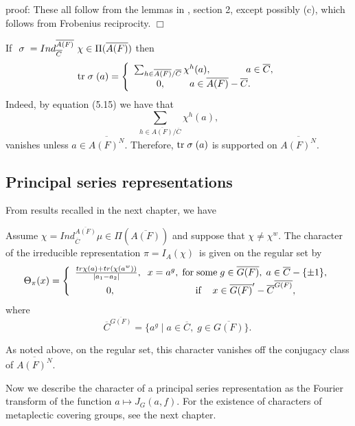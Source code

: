 proof: These all follow from the lemmas in \cite{GeKn}, section 2, except
possibly (c), which follows from Frobenius reciprocity. $\Box $

\begin{corollary}
If $\ \sigma {\rm \;}=Ind_{\overline{C}}^{\overline{A(F)}}\ \chi
\in \Pi (\overline{A(F)})$ then 
\[
{\rm tr}\;\sigma {\rm \;}(a)=\left\{ 
\begin{array}{c}
\sum_{h\in \overline{A(F)}/\overline{C}}\chi
^h(a),\;\;\;\;\;\;\;\;\;\;\;\;\;a\in \overline{C}, \\ 
0,\;\;\;\;\;\;\;\;\;a\in \overline{A(F)}-\overline{C}.
\end{array}
\right. 
\]
Indeed, by equation (5.15) we have that
\[
\sum_{h\in \overline{A(F)}/\overline{C}}\chi^h(a),
\]
vanishes unless $a\in \overline{A(F)^N}$. Therefore,
${\rm tr}\;\sigma {\rm \;}(a)$ is supported on
$\overline{A(F)^N}$.
\end{corollary}

\subsection{Principal series representations}
From results recalled in the next chapter, we have

\begin{lemma}
Assume $\chi =Ind_{\overline{C}}^{\overline{A(F)}}\mu
\in \Pi (\overline{A(F)})$ and suppose that $\chi \neq \chi ^w$.
The character of the
irreducible representation $\pi =I_{A}(\chi )$\ is given on the regular
set by
\[
\Theta _\pi (x)=\left\{
\begin{array}{c}
\frac{tr\chi (a)+tr(\chi (a^w))}{|a_1-a_2|},
\;\;x=a^g,\;{\rm for\;some}\;g\in \overline{G(F)},
\;a\in \overline{C}-\{\pm 1\}, \\
0,\;\;\;\;\;\;\;\;\;\;\;\;\;\;\;\;\;\;\;\;\;\;\;\;\;\;\;\;\;
{\rm \;if\;}\;\;\;
x\in \overline{G(F)}^{\prime }-\overline{C}^{\overline{G(F)}},
\end{array}
\right.
\]
where
\[
\overline{C}^{\overline{G(F)}}=\{a^g\;|\;a\in \overline{C},\;g\in
\overline{G(F)}\}.\
\]
\end{lemma}

\begin{remark} As noted above, on the regular set,
this character vanishes off the conjugacy class of $\overline{A(F)^N}$.
\end{remark}

Now we describe the character of a principal series representation
as the Fourier transform of the function $a\longmapsto J_G(a,f)$.
For the existence of characters of metaplectic covering groups,
see the next chapter.

